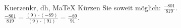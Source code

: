 \begin{MAufgabe}{Kuerzen}{kr, dh, MaTeX}
K\"urzen Sie soweit m\"oglich: $\frac{-801}{819}$.\\ 
\ifLsg\MLoesung
\quad $\frac{-801}{819}=\frac{(9)\cdot(-89)}{(9)\cdot(91)}=\frac{-89}{91}$.\else\relax\fi
 \end{MAufgabe}